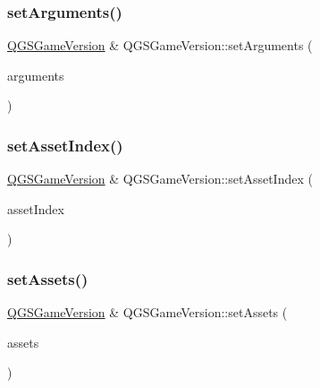\mbox{\label{class_q_g_s_game_version_a51330a6a6ae0efc4e23fa043a9c337d7}} 
\subsubsection{\texorpdfstring{set\+Arguments()}{setArguments()}}
{\footnotesize\ttfamily \mbox{\hyperlink{class_q_g_s_game_version}{Q\+G\+S\+Game\+Version}} \& Q\+G\+S\+Game\+Version\+::set\+Arguments (\begin{DoxyParamCaption}\item[{const \mbox{\hyperlink{class_q_g_s_arguments}{Q\+G\+S\+Arguments}} \&}]{arguments }\end{DoxyParamCaption})}

\mbox{\label{class_q_g_s_game_version_afefaf5aaf3654b674ee02dc446d93755}} 
\subsubsection{\texorpdfstring{set\+Asset\+Index()}{setAssetIndex()}}
{\footnotesize\ttfamily \mbox{\hyperlink{class_q_g_s_game_version}{Q\+G\+S\+Game\+Version}} \& Q\+G\+S\+Game\+Version\+::set\+Asset\+Index (\begin{DoxyParamCaption}\item[{const \mbox{\hyperlink{class_q_g_s_asset_index}{Q\+G\+S\+Asset\+Index}} \&}]{asset\+Index }\end{DoxyParamCaption})}

\mbox{\label{class_q_g_s_game_version_afe221dac54bfa157fe60e9da40ba1096}} 
\subsubsection{\texorpdfstring{set\+Assets()}{setAssets()}}
{\footnotesize\ttfamily \mbox{\hyperlink{class_q_g_s_game_version}{Q\+G\+S\+Game\+Version}} \& Q\+G\+S\+Game\+Version\+::set\+Assets (\begin{DoxyParamCaption}\item[{const Q\+String \&}]{assets }\end{DoxyParamCaption})}

